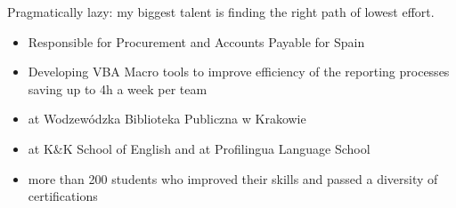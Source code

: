 \documentclass[10pt,a4paper]{../altacv}
\begin{document}

\begin{fullwidth}
\makecvheader
\end{fullwidth}

Pragmatically lazy: my biggest talent is finding the right path of lowest effort.
\smallskip


\begin{itemize}
	\item Responsible for Procurement and Accounts Payable for Spain
	\item Developing VBA Macro tools to improve efficiency of the reporting processes saving up to 4h a week per team
\end{itemize}

\medskip

\begin{itemize}
	\item at Wodzewódzka Biblioteka Publiczna w Krakowie
	\item at K\&K School of English and at Profilingua Language School
	\item more than 200 students who improved their skills and passed a diversity of certifications
\end{itemize}
\smallskip
\end{document}
